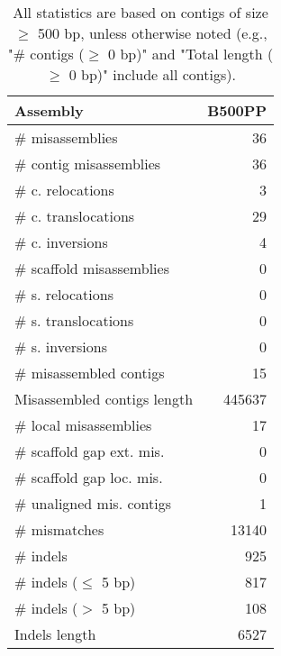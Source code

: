 \documentclass[12pt,a4paper]{article}
\begin{document}
\begin{table}[ht]
\begin{center}
\caption{All statistics are based on contigs of size $\geq$ 500 bp, unless otherwise noted (e.g., "\# contigs ($\geq$ 0 bp)" and "Total length ($\geq$ 0 bp)" include all contigs).}
\begin{tabular}{|l*{1}{|r}|}
\hline
Assembly & B500PP \\ \hline
\# misassemblies & 36 \\ \hline
\hspace{2mm}\# contig misassemblies & 36 \\ \hline
\hspace{5mm}\# c. relocations & 3 \\ \hline
\hspace{5mm}\# c. translocations & 29 \\ \hline
\hspace{5mm}\# c. inversions & 4 \\ \hline
\hspace{2mm}\# scaffold misassemblies & 0 \\ \hline
\hspace{5mm}\# s. relocations & 0 \\ \hline
\hspace{5mm}\# s. translocations & 0 \\ \hline
\hspace{5mm}\# s. inversions & 0 \\ \hline
\# misassembled contigs & 15 \\ \hline
Misassembled contigs length & 445637 \\ \hline
\# local misassemblies & 17 \\ \hline
\# scaffold gap ext. mis. & 0 \\ \hline
\# scaffold gap loc. mis. & 0 \\ \hline
\# unaligned mis. contigs & 1 \\ \hline
\# mismatches & 13140 \\ \hline
\# indels & 925 \\ \hline
\hspace{5mm}\# indels ($\leq$ 5 bp) & 817 \\ \hline
\hspace{5mm}\# indels ($>$ 5 bp) & 108 \\ \hline
Indels length & 6527 \\ \hline
\end{tabular}
\end{center}
\end{table}
\end{document}
